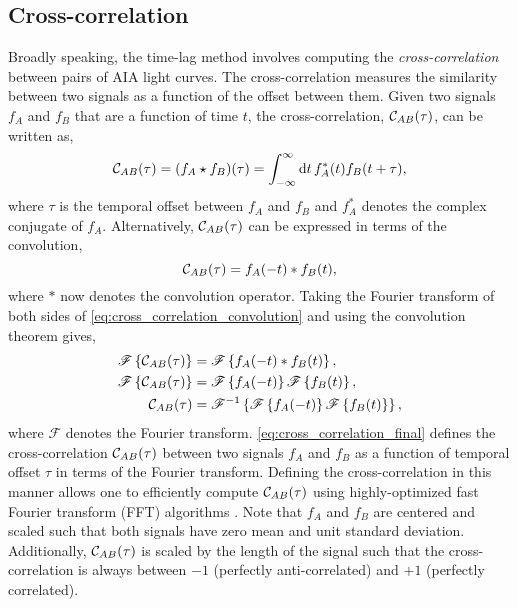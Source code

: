 \subsection{Cross-correlation}\label{subsec:cross_correlation}

Broadly speaking, the time-lag method involves computing the \textit{cross-correlation} between pairs of AIA light curves. The cross-correlation measures the similarity between two signals as a function of the offset between them. Given two signals $f_A$ and $f_B$ that are a function of time $t$, the cross-correlation, $\mathcal{C}_{AB}(\tau)$, can be written as,
\begin{equation}
    \mathcal{C}_{AB}(\tau) = (f_A\star f_B)(\tau) = \int_{-\infty}^\infty\textup{d}t\,f_A^{\ast}(t)f_B(t + \tau),
\end{equation}
where $\tau$ is the temporal offset between $f_A$ and $f_B$ and $f_A^{\ast}$ denotes the complex conjugate of $f_A$. Alternatively, $\mathcal{C}_{AB}(\tau)$ can be expressed in terms of the convolution,
\begin{equation}\label{eq:cross_correlation_convolution}
    \mathcal{C}_{AB}(\tau) = f_A(-t) \ast f_B(t),
\end{equation}
where $\ast$ now denotes the convolution operator. Taking the Fourier transform of both sides of \autoref{eq:cross_correlation_convolution} and using the convolution theorem \citep[section 20.4]{arfken_mathematical_2013} gives,
\begin{align}\label{eq:cross_correlation_final}
    \mathscr{F}\left\{\mathcal{C}_{AB}(\tau)\right\} &= \mathscr{F}\left\{f_A(-t) \ast f_B(t)\right\}, \nonumber \\
    \mathscr{F}\left\{\mathcal{C}_{AB}(\tau)\right\} &= \mathscr{F}\left\{f_A(-t)\right\}\mathscr{F}\left\{f_B(t)\right\}, \nonumber \\
    \mathcal{C}_{AB}(\tau) &= \mathscr{F}^{-1}\left\{\mathscr{F}\left\{f_A(-t)\right\}\mathscr{F}\left\{f_B(t)\right\}\right\},
\end{align}
where $\mathscr{F}$ denotes the Fourier transform. \autoref{eq:cross_correlation_final} defines the cross-correlation $\mathcal{C}_{AB}(\tau)$ between two signals $f_A$ and $f_B$ as a function of temporal offset $\tau$ in terms of the Fourier transform. Defining the cross-correlation in this manner allows one to efficiently compute $\mathcal{C}_{AB}(\tau)$ using highly-optimized fast Fourier transform (FFT) algorithms \citep[e.g. the widely-used FFT algorithm developed by][]{cooley_algorithm_1965}. Note that $f_A$ and $f_B$ are centered and scaled such that both signals have zero mean and unit standard deviation. Additionally, $\mathcal{C}_{AB}(\tau)$ is scaled by the length of the signal such that the cross-correlation is always between $-1$ (perfectly anti-correlated) and $+1$ (perfectly correlated).

